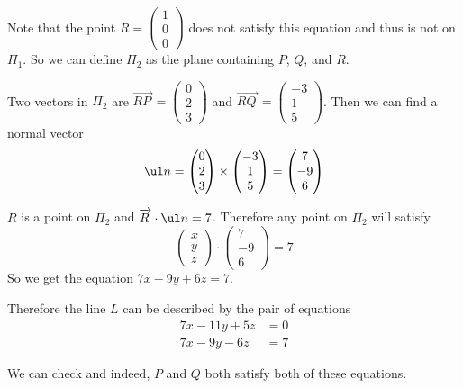 \documentclass[a4paper]{article}
\begin{document}
Note that the point $R = \begin{pmatrix}1\\ 0\\ 0\end{pmatrix}$ does not satisfy this equation and thus is not on $\Pi_1$. So we can define $\Pi_2$ as the plane containing $P$, $Q$, and $R$.

Two vectors in $\Pi_2$ are $\overrightarrow{RP\,} = \begin{pmatrix}0\\ 2\\ 3\end{pmatrix}$ and $\overrightarrow{RQ\,} = \begin{pmatrix}-3\\ 1\\ 5\end{pmatrix}$. Then we can find a normal vector $$\ul n = \begin{pmatrix}0\\ 2\\ 3\end{pmatrix} \times \begin{pmatrix}-3\\ 1\\ 5\end{pmatrix} = \begin{pmatrix}7\\ -9\\ 6\end{pmatrix}$$

$R$ is a point on $\Pi_2$ and $\overrightarrow{R\,} \cdot \ul n = 7$. Therefore any point on $\Pi_2$ will satisfy $$\begin{pmatrix}x\\ y\\ z\end{pmatrix} \cdot \begin{pmatrix}7\\ -9\\ 6\end{pmatrix} = 7$$
So we get the equation $7x - 9y + 6z = 7$.

Therefore the line $L$ can be described by the pair of equations \begin{align*}
7x - 11y + 5z &= 0\\
7x - 9y - 6z &= 7
\end{align*}

We can check and indeed, $P$ and $Q$ both satisfy both of these equations.

\end{document}
